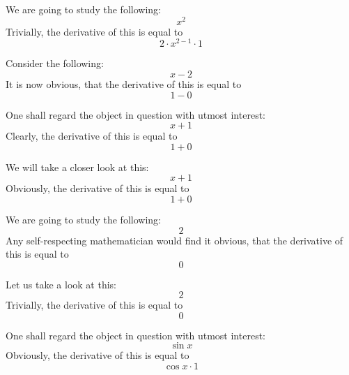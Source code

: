 \documentclass{article}
\begin{document}
We are going to study the following:
\begin{equation}
x ^{2 } 
\end{equation}
Trivially, the derivative of this is equal to
\begin{equation}
2 \cdot x ^{2 - 1 } \cdot 1 
\end{equation}

Consider the following:
\begin{equation}
x - 2 
\end{equation}
It is now obvious, that the derivative of this is equal to
\begin{equation}
1 - 0 
\end{equation}

One shall regard the object in question with utmost interest:
\begin{equation}
x + 1 
\end{equation}
Clearly, the derivative of this is equal to
\begin{equation}
1 + 0 
\end{equation}

We will take a closer look at this:
\begin{equation}
x + 1 
\end{equation}
Obviously, the derivative of this is equal to
\begin{equation}
1 + 0 
\end{equation}

We are going to study the following:
\begin{equation}
2 
\end{equation}
Any self-respecting mathematician would find it obvious, that the derivative of this is equal to
\begin{equation}
0 
\end{equation}

Let us take a look at this:
\begin{equation}
2 
\end{equation}
Trivially, the derivative of this is equal to
\begin{equation}
0 
\end{equation}

One shall regard the object in question with utmost interest:
\begin{equation}
\sin x 
\end{equation}
Obviously, the derivative of this is equal to
\begin{equation}
\cos x \cdot 1 
\end{equation}
\end{document}
